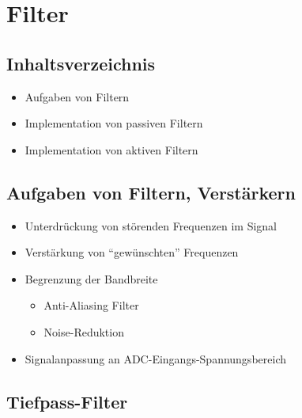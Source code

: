 \section{Filter}
\subsection{Inhaltsverzeichnis}
\begin{itemize}
  \item Aufgaben von Filtern
  \item Implementation von passiven Filtern
  \item Implementation von aktiven Filtern
\end{itemize}

\subsection{Aufgaben von Filtern, Verstärkern}
\begin{itemize}
  \item Unterdrückung von störenden Frequenzen im Signal
  \item Verstärkung von "`gewünschten"' Frequenzen
  \item Begrenzung der Bandbreite
  \begin{itemize}
    \item Anti-Aliasing Filter
    \item Noise-Reduktion
  \end{itemize}
  \item Signalanpassung an ADC-Eingangs-Spannungsbereich
\end{itemize}
\newpage
\subsection{Tiefpass-Filter}

